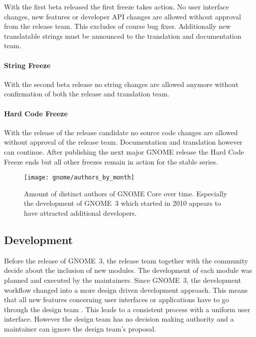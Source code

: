 With the first beta released the first freeze takes action. No user interface
changes, new features or developer \ac{API} changes are allowed without
approval from the release team. This excludes of course bug fixes. Additionally
new translatable strings must be announced to the translation and documentation
team.

\paragraph{String Freeze}

With the second beta release no string changes are allowed anymore without
confirmation of both the release and translation team.

\paragraph{Hard Code Freeze}

With the release of the release candidate no source code changes are allowed
without approval of the release team. Documentation and translation however can
continue. After publishing the next major GNOME release the Hard Code Freeze
ends but all other freezes remain in action for the stable series.

\begin{figure}[htbp]
  \centering
  \texttt{[image: gnome/authors\_by\_month]}
  \caption[Authors by Month, GNOME]
  {Amount of distinct authors of GNOME Core over time. Especially the
    development of GNOME~3 which started in 2010 appears to have attracted
    additional developers.}
  \label{fig:gnome:abm}
\end{figure}


\subsection{Development} %

Before the release of GNOME~3, the release team together with the community
decide about the inclusion of new modules. The development of each module was
planned and executed by the maintainers. Since GNOME~3, the development
workflow changed into a more design driven development approach. This means
that all new features concerning user interfaces or applications have to go
through the design team \cite{GNOMEDesignTeam}. This leads to a consistent
process with a uniform user interface. However the design team has no decision
making authority and a maintainer can ignore the design team's proposal.

